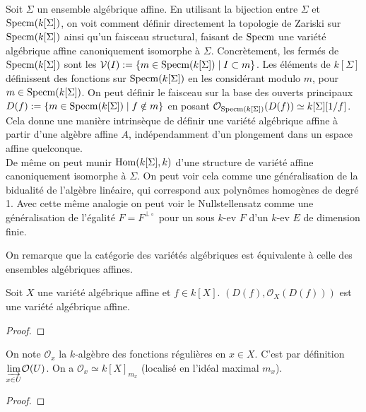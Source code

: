 \begin{rem}
Soit $\Sigma$ un ensemble algébrique affine. En utilisant la bijection entre $\Sigma$ et $\operatorname{Specm} (k[\Sigma])$, on voit comment définir directement la topologie de Zariski sur $\operatorname{Specm} (k[\Sigma])$ ainsi qu'un faisceau structural, faisant de $\operatorname{Specm}$ une variété algébrique affine canoniquement isomorphe à $\Sigma$. Concrètement, les fermés de $\operatorname{Specm} (k[\Sigma])$ sont les $\mathcal{V}(I):=\lbrace m \in \operatorname{Specm} (k[\Sigma]) \mid I\subset m \rbrace$. Les éléments de $k[\Sigma]$ définissent des fonctions sur $\operatorname{Specm} (k[\Sigma])$ en les considérant modulo $m$, pour $m \in \operatorname{Specm} (k[\Sigma])$. On peut définir le faisceau sur la base des ouverts principaux $D(f):=\lbrace m \in \operatorname{Specm} (k[\Sigma]) \mid f \notin m\rbrace$ en posant $\mathcal{O}_{\operatorname{Specm} (k[\Sigma])}(D(f))\simeq k[\Sigma][1/f]$.\\
Cela donne une manière intrinsèque de définir une variété algébrique affine à partir d'une algèbre affine $A$, indépendamment d'un plongement dans un espace affine quelconque.\\
De même on peut munir $\operatorname{Hom}(k[\Sigma],k)$ d'une structure de variété affine canoniquement isomorphe à $\Sigma$. On peut voir cela comme une généralisation de la bidualité de l'algèbre linéaire, qui correspond aux polynômes homogènes de degré 1. Avec cette même analogie on peut voir le Nullstellensatz comme une généralisation de l'égalité $F=F^{\bot\circ}$ pour un sous $k$-ev $F$ d'un $k$-ev $E$ de dimension finie.
\end{rem}

\begin{rem}
On remarque que la catégorie des variétés algébriques est équivalente à celle des ensembles algébriques affines.
\end{rem}

\begin{ex}
Soit $X$ une variété algébrique affine et $f\in k[X]$. $(D(f), \mathcal{O}_X(D(f)))$ est une variété algébrique affine.
\end{ex}
\begin{proof}

\end{proof}

\begin{prop}
On note $\mathcal{O}_x$ la $k$-algèbre des fonctions régulières en $x\in X$. C'est par définition $ \underset{x\in U}{\varinjlim} \mathcal{O}(U)$. On a $\mathcal{O}_x\simeq k[X]_{m_x}$ (localisé en l'idéal maximal $m_x$).
\end{prop}
\begin{proof}

\end{proof}

